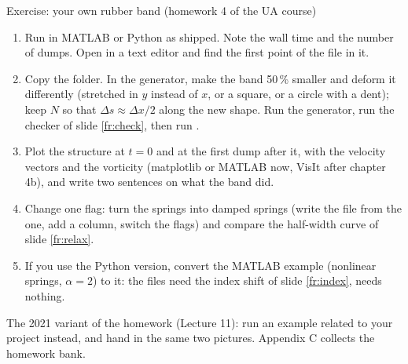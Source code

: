 \documentclass[aspectratio=169,11pt]{beamer}
\begin{document}
\begin{frame}{Exercise: your own rubber band (homework 4 of the UA course)}
\label{fr:exercise}
\small
\begin{enumerate}
  \item Run  in MATLAB or Python as shipped. Note the wall time and the number of dumps. Open  in a text editor and find the first point of the  file in it.
  \item Copy the folder. In the generator, make the band 50\,\% smaller and deform it differently (stretched in $y$ instead of $x$, or a square, or a circle with a dent); keep $N$ so that $\Delta s \approx \Delta x/2$ along the new shape. Run the generator, run the checker of slide \ref{fr:check}, then run .
  \item Plot the structure at $t = 0$ and at the first dump after it, with the velocity vectors and the vorticity (matplotlib or MATLAB now, VisIt after chapter 4b), and write two sentences on what the band did.
  \item Change one flag: turn the springs into damped springs (write the  file from the  one, add a column, switch the flags) and compare the half-width curve of slide \ref{fr:relax}.
  \item If you use the Python version, convert the MATLAB  example (nonlinear springs, $\alpha = 2$) to it: the files need the index shift of slide \ref{fr:index},  needs nothing.
\end{enumerate}
The 2021 variant of the homework (Lecture 11): run an example related to your project instead, and hand in the same two pictures. Appendix C collects the homework bank.
\end{frame}
\end{document}
